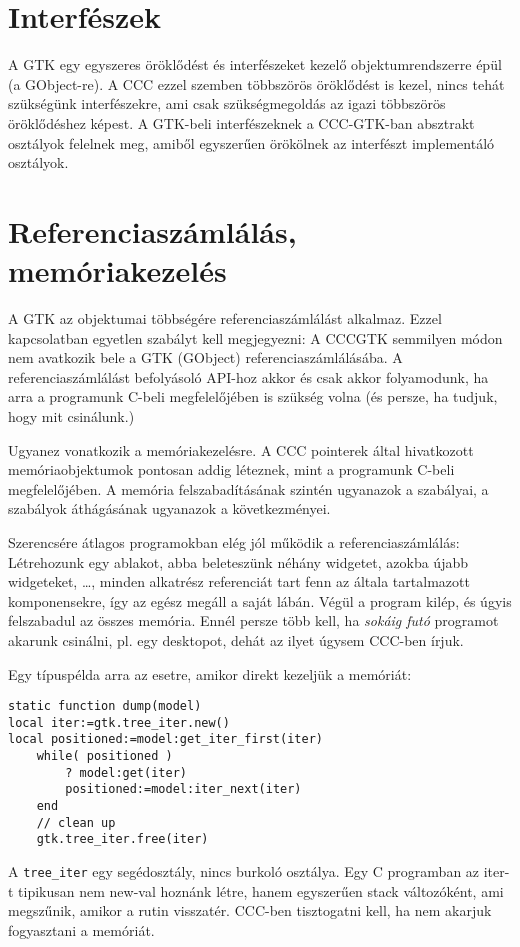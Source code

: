 \section{Interfészek}

A GTK egy egyszeres öröklődést és interfészeket
kezelő objektumrendszerre épül (a GObject-re). A CCC ezzel szemben 
többszörös öröklődést is kezel, nincs tehát szükségünk interfészekre,
ami csak szükségmegoldás az igazi többszörös öröklődéshez képest.
A GTK-beli interfészeknek a CCC-GTK-ban absztrakt osztályok
felelnek meg, amiből egyszerűen örökölnek az interfészt 
implementáló osztályok.


\section{Referenciaszámlálás, memóriakezelés}

A GTK az objektumai többségére referenciaszámlálást alkalmaz.
Ezzel kapcsolatban egyetlen szabályt kell megjegyezni:
A CCCGTK semmilyen módon nem avatkozik bele a GTK (GObject)
referenciaszámlálásába. A referenciaszámlálást befolyásoló
API-hoz akkor és csak akkor folyamodunk, ha arra a
programunk C-beli megfelelőjében is szükség volna
(és persze, ha tudjuk, hogy mit csinálunk.)

Ugyanez vonatkozik a memóriakezelésre.
A CCC pointerek által hivatkozott memóriaobjektumok
pontosan addig léteznek, mint a programunk C-beli
megfelelőjében. A memória felszabadításának szintén
ugyanazok a szabályai, a szabályok áthágásának
ugyanazok a következményei.

Szerencsére átlagos programokban elég jól működik
a referenciaszámlálás: Létrehozunk egy ablakot, 
abba beleteszünk néhány widgetet, azokba újabb widgeteket, \ldots,
minden alkatrész referenciát tart fenn az általa tartalmazott
komponensekre, így az egész megáll a saját lábán.
Végül a program kilép, és úgyis felszabadul az
összes memória. Ennél persze több kell, ha {\em sokáig futó\/} 
programot akarunk csinálni, pl. egy desktopot,
dehát az ilyet úgysem CCC-ben írjuk.

Egy típuspélda arra az esetre, 
amikor direkt kezeljük a memóriát:
\begin{verbatim}
static function dump(model)
local iter:=gtk.tree_iter.new()
local positioned:=model:get_iter_first(iter)
    while( positioned )
        ? model:get(iter)
        positioned:=model:iter_next(iter)
    end
    // clean up
    gtk.tree_iter.free(iter)
\end{verbatim}
A \verb!tree_iter! egy segédosztály, nincs burkoló osztálya.
Egy C programban az iter-t tipikusan nem new-val hoznánk létre,
hanem egyszerűen stack változóként, ami megszűnik,
amikor a rutin visszatér. CCC-ben tisztogatni kell,
ha nem akarjuk fogyasztani a memóriát.


